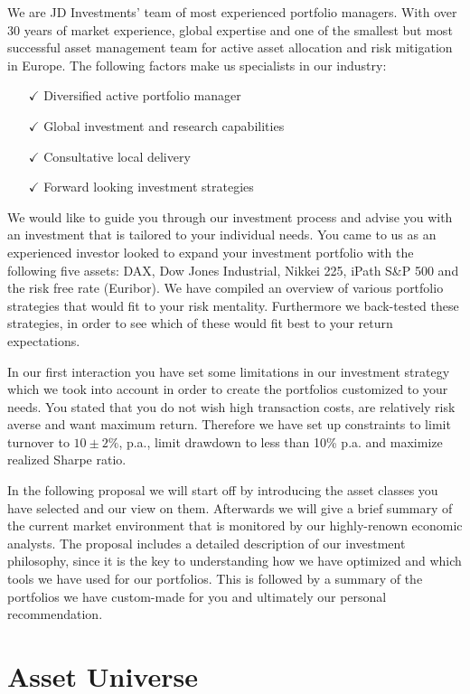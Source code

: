 \documentclass[11pt, DIV=15]{scrreprt}
\begin{document}
We are JD Investments’ team of most experienced portfolio managers.
With over 30 years of market experience, global expertise and one of the smallest but most successful asset management team for active asset allocation and risk mitigation in Europe.
The following factors make us specialists in our industry: 

\begin{itemize}
\item[$\checkmark$] Diversified active portfolio manager
\item[$\checkmark$] Global investment and research capabilities 
\item[$\checkmark$] Consultative local delivery 
\item[$\checkmark$] Forward looking investment strategies 
\end{itemize}

We would like to guide you through our investment process and advise you with an investment that is tailored to your individual needs.
You came to us as an experienced investor looked to expand your investment portfolio with the following five assets: DAX, Dow Jones Industrial, Nikkei 225, iPath S\&P 500 and the risk free rate (Euribor).
We have compiled an overview of various portfolio strategies that would fit to your risk mentality.
Furthermore we back-tested these strategies, in order to see which of these would fit best to your return expectations.
  
In our first interaction you have set some limitations in our investment strategy which we took into account in order to create the portfolios customized to your needs.
You stated that you do not wish high transaction costs, are relatively risk averse and want maximum return.
Therefore we have set up constraints to limit turnover to $10 \pm 2\%$, p.a., limit drawdown to less than 10\% p.a. and maximize realized Sharpe ratio.

In the following proposal we will start off by introducing the asset classes you have selected and our view on them.
Afterwards we will give a brief summary of the current market environment that is monitored by our highly-renown economic analysts.
The proposal includes a detailed description of our investment philosophy, since it is the key to understanding how we have optimized and which tools we have used for our portfolios.
This is followed by a summary of the portfolios we have custom-made for you and ultimately our personal recommendation.


\chapter{Asset Universe}
\end{document}
